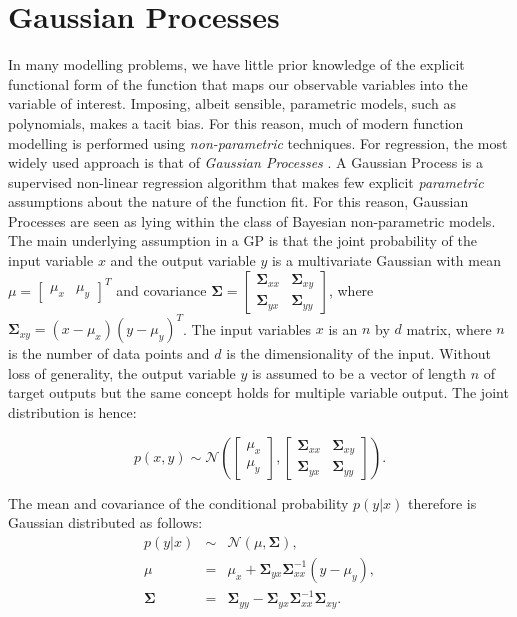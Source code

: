 \documentclass[useAMS,usenatbib,fleqn]{mn2e}
\begin{document}
\section{Gaussian Processes}
\label{sec-gaussian-process}
In many modelling problems, we have little prior knowledge of the explicit functional form of the function that maps our observable variables into the variable of interest. Imposing, albeit sensible, parametric models, such as polynomials, makes a tacit bias. For this reason, much of modern function modelling is performed using \emph{non-parametric} techniques. For regression, the most widely used approach is that of \emph{Gaussian Processes} \citep{rasmussen2006gaussian}.
A Gaussian Process is a supervised non-linear regression algorithm that makes few explicit \emph{parametric} assumptions about the nature of the function fit. For this reason, Gaussian Processes are seen as lying within the class of Bayesian non-parametric models. The main underlying assumption in a GP is that the joint probability of the input variable $x$ and the output variable $y$ is a multivariate Gaussian with mean $\mu=\begin{bmatrix} \mu_{x} & \mu_{y}\end{bmatrix}^{T}$ and covariance $\mathbf\Sigma=\begin{bmatrix}\mathbf\Sigma_{xx} & \mathbf\Sigma_{xy} \\ \mathbf\Sigma_{yx} & \mathbf\Sigma_{yy} \end{bmatrix}$, where $\mathbf\Sigma_{xy}=(x-\mu_{x})(y-\mu_{y})^{T}$. The input variables $x$ is an $n$ by $d$ matrix, where $n$ is the number of data points and $d$ is the dimensionality of the input. Without loss of generality, the output variable $y$ is assumed to be a vector of length $n$ of target outputs but the same concept holds for multiple variable output. The joint distribution is hence:

\begin{equation}
p\left ( x,y\right) \sim \mathcal{N} \left ( \begin{bmatrix}\mu_{x}\\\mu_{y} \end{bmatrix}, \begin{bmatrix}\mathbf\Sigma_{xx} & \mathbf\Sigma_{xy}\\\mathbf\Sigma_{yx} & \mathbf\Sigma_{yy} \end{bmatrix}\right ).
\end{equation}

The mean and covariance of the conditional probability $p(y|x)$ therefore is Gaussian distributed as follows:
\begin{equation}
\begin{array}{rcl}
p(y|x)		&	\sim		&	\mathcal{N} \left ( \mu, \mathbf\Sigma \right ),\\
\mu			&	=		&	\mu_{x}+\mathbf\Sigma_{yx}\mathbf\Sigma_{xx}^{-1}\left ( y-\mu_{y}\right ),\\
\mathbf\Sigma		&	=		&	\mathbf\Sigma_{yy}-\mathbf\Sigma_{yx}\mathbf\Sigma_{xx}^{-1}\mathbf\Sigma_{xy}.
\end{array}
\end{equation}
\end{document}
